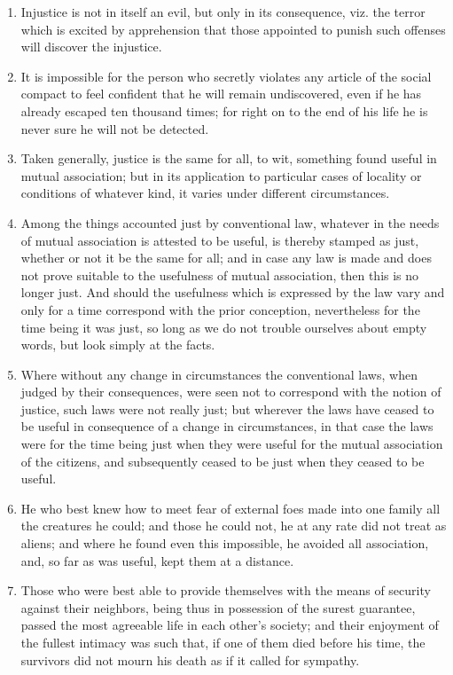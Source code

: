 \documentclass[12pt]{article}
\begin{document}
\begin{enumerate}[leftmargin=.5cm]
	\item Injustice is not in itself an evil, but only in its consequence, viz. the terror which is excited by apprehension that those appointed to punish such offenses will discover the injustice. 

	\item It is impossible for the person who secretly violates any article of the social compact to feel confident that he will remain undiscovered, even if he has already escaped ten thousand times; for right on to the end of his life he is never sure he will not be detected. 
	
	\item Taken generally, justice is the same for all, to wit, something found useful in mutual association; but in its application to particular cases of locality or conditions of whatever kind, it varies under different circumstances. 

	\item Among the things accounted just by conventional law, whatever in the needs of mutual association is attested to be useful, is thereby stamped as just, whether or not it be the same for all; and in case any law is made and does not prove suitable to the usefulness of mutual association, then this is no longer just. And should the usefulness which is expressed by the law vary and only for a time correspond with the prior conception, nevertheless for the time being it was just, so long as we do not trouble ourselves about empty words, but look simply at the facts. 
	
	\item Where without any change in circumstances the conventional laws, when judged by their consequences, were seen not to correspond with the notion of justice, such laws were not really just; but wherever the laws have ceased to be useful in consequence of a change in circumstances, in that case the laws were for the time being just when they were useful for the mutual association of the citizens, and subsequently ceased to be just when they ceased to be useful. 

	\item He who best knew how to meet fear of external foes made into one family all the creatures he could; and those he could not, he at any rate did not treat as aliens; and where he found even this impossible, he avoided all association, and, so far as was useful, kept them at a distance. 

	\item Those who were best able to provide themselves with the means of security against their neighbors, being thus in possession of the surest guarantee, passed the most agreeable life in each other's society; and their enjoyment of the fullest intimacy was such that, if one of them died before his time, the survivors did not mourn his death as if it called for sympathy. 
\end{enumerate}
\end{document}
